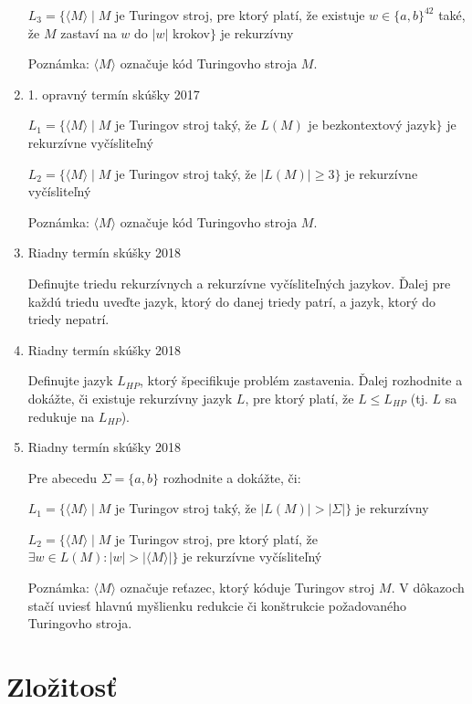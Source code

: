 \documentclass[]{article}
\begin{document}
\begin{enumerate}
		$L_3 = \{\langle M \rangle \mid M$ je Turingov stroj, pre ktorý platí, že existuje $w \in \{a,b\}^{42}$ také, že $M$ zastaví na $w$ do $\vert w \vert$ krokov$\}$ je rekurzívny
		
		Poznámka: $\langle M \rangle$ označuje kód Turingovho stroja $M$.
		
		\item 1. opravný termín skúšky 2017
		
		$L_1 = \{\langle M \rangle \mid M$ je Turingov stroj taký, že $L(M)$ je bezkontextový jazyk$\}$ je rekurzívne vyčísliteľný
		
		$L_2 = \{\langle M \rangle \mid M$ je Turingov stroj taký, že $\vert L(M) \vert \geq 3\}$ je rekurzívne vyčísliteľný
		
		Poznámka: $\langle M \rangle$ označuje kód Turingovho stroja $M$.
		
		\item Riadny termín skúšky 2018
		
		Definujte triedu rekurzívnych a rekurzívne vyčísliteľných jazykov. Ďalej pre každú triedu uveďte jazyk, ktorý do danej triedy patrí, a jazyk, ktorý do triedy nepatrí.
		
		\item Riadny termín skúšky 2018
		
		Definujte jazyk $L_{HP}$, ktorý špecifikuje problém zastavenia. Ďalej rozhodnite a dokážte, či existuje rekurzívny jazyk $L$, pre ktorý platí, že $L \leq L_{HP}$ (tj. $L$ sa redukuje na $L_{HP}$).
		
		\item Riadny termín skúšky 2018
		
		Pre abecedu $\Sigma = \{a, b\}$ rozhodnite a dokážte, či:
		
		$L_1 = \{\langle M \rangle \mid M$ je Turingov stroj taký, že $\vert L(M) \vert  > \vert \Sigma \vert\}$ je rekurzívny
		
		$L_2 = \{\langle M \rangle \mid M$ je Turingov stroj, pre ktorý platí, že $\exists w \in L(M) : \vert w \vert > \vert \langle M \rangle \vert\}$ je rekurzívne vyčísliteľný
		
		Poznámka: $\langle M \rangle$ označuje reťazec, ktorý kóduje Turingov stroj $M$. V dôkazoch stačí uviesť hlavnú myšlienku redukcie či konštrukcie požadovaného Turingovho stroja.
	\end{enumerate}
	
	\section{Zložitosť}
	
\end{document}

